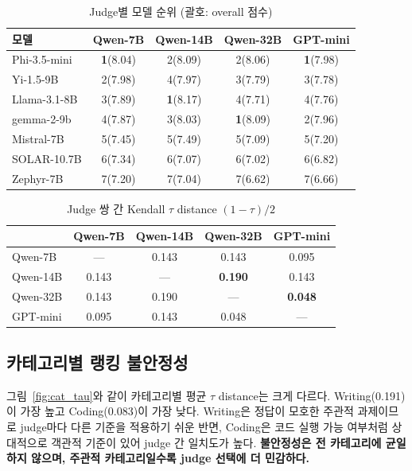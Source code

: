 \documentclass{kcc}
\begin{document}
\begin{table}[t]
  \caption{Judge별 모델 순위 (괄호: overall 점수)}
  \label{tab:ranking}
  \centering\small
  \begin{tabular}{lcccc}
    \toprule
    모델 & Qwen-7B & Qwen-14B & Qwen-32B & GPT-mini \\
    \midrule
    Phi-3.5-mini   & \textbf{1}(8.04) & 2(8.09) & 2(8.06) & \textbf{1}(7.98) \\
    Yi-1.5-9B      & 2(7.98) & 4(7.97) & 3(7.79) & 3(7.78) \\
    Llama-3.1-8B   & 3(7.89) & \textbf{1}(8.17) & 4(7.71) & 4(7.76) \\
    gemma-2-9b     & 4(7.87) & 3(8.03) & \textbf{1}(8.09) & 2(7.96) \\
    Mistral-7B     & 5(7.45) & 5(7.49) & 5(7.09) & 5(7.20) \\
    SOLAR-10.7B    & 6(7.34) & 6(7.07) & 6(7.02) & 6(6.82) \\
    Zephyr-7B      & 7(7.20) & 7(7.04) & 7(6.62) & 7(6.66) \\
    \bottomrule
  \end{tabular}
\end{table}

\begin{table}[t]
  \caption{Judge 쌍 간 Kendall $\tau$ distance $(1-\tau)/2$}
  \label{tab:kendall}
  \centering\small
  \begin{tabular}{lcccc}
    \toprule
    & Qwen-7B & Qwen-14B & Qwen-32B & GPT-mini \\
    \midrule
    Qwen-7B  & —     & 0.143 & 0.143 & 0.095 \\
    Qwen-14B & 0.143 & —     & \textbf{0.190} & 0.143 \\
    Qwen-32B & 0.143 & 0.190 & —     & \textbf{0.048} \\
    GPT-mini & 0.095 & 0.143 & 0.048 & — \\
    \bottomrule
  \end{tabular}
\end{table}

\subsection{카테고리별 랭킹 불안정성}

그림~\ref{fig:cat_tau}와 같이 카테고리별 평균 $\tau$ distance는 크게 다르다.
Writing(0.191)이 가장 높고 Coding(0.083)이 가장 낮다.
Writing은 정답이 모호한 주관적 과제이므로 judge마다 다른 기준을 적용하기 쉬운
반면, Coding은 코드 실행 가능 여부처럼 상대적으로 객관적 기준이 있어 judge 간
일치도가 높다. \textbf{불안정성은 전 카테고리에 균일하지 않으며, 주관적
카테고리일수록 judge 선택에 더 민감하다.}
\end{document}
